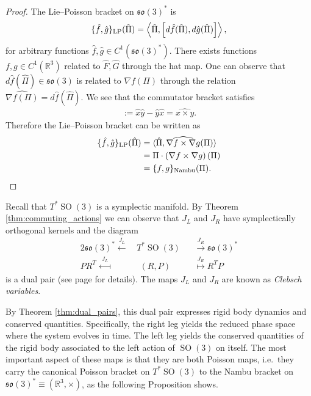 \documentclass[12pt]{amsart}
\newcommand{\so}{\ensuremath{\mathfrak{so}}}
\DeclareMathOperator{\SO}{SO}
\begin{document}
  \begin{proof}
    The Lie--Poisson bracket on $\so(3)^*$ is
    \begin{align*}
      \{ \hat{f} , \hat{g} \}_{\rm LP} (\hat{\Pi}) =
      \left \langle \hat{\Pi} , \left[ d\hat{f}(\hat{\Pi}) , d\hat{g}(\hat{\Pi}) \right]
        \right \rangle,
    \end{align*}
    for arbitrary functions $\hat{f},\hat{g} \in C^1(\so(3)^*)$.
    There exists functions $f,g \in C^1(\mathbb{R}^3)$ related to $\hat{F},\hat{G}$ through the hat map.
    One can observe that $d\hat{f}(\hat{\Pi}) \in \so(3)$ is 
    related to $\nabla f(\Pi)$ through the relation $\widehat{ \nabla f(\Pi)} = d\hat{f}( \hat{\Pi})$.
    We see that the commutator bracket satisfies
    \begin{align*}
      [\hat{x},\hat{y} ] := \hat{x} \hat{y} - \hat{y} \hat{x} = \widehat{x \times y }.
    \end{align*}
    Therefore the Lie--Poisson bracket can be written as
    \begin{align*}
    \{ \hat{f} , \hat{g} \}_{\rm LP}(\hat{\Pi})
    &= \langle \hat{\Pi} , \widehat{ \nabla f \times \nabla g }(\Pi) \rangle \\
    &= \Pi \cdot  \left( \nabla f \times \nabla g \right)(\Pi) \\
    &= \{ f , g \}_{\rm Nambu}(\Pi).
    \end{align*}
  \end{proof}

  Recall that $T^*\SO(3)$ is a symplectic manifold.
  By Theorem \ref{thm:commuting_actions}
  we can observe that $J_L$ and $J_R$ have symplectically
  orthogonal kernels and the diagram
  \begin{alignat*}{2}
    \so(3)^* \stackrel{J_L}{\longleftarrow}&
    \,T^* \SO(3)
    &&\stackrel{J_R}{\longrightarrow} \so(3)^* \\
     PR^T \stackrel{J_L}{\longmapsfrom}&
    \;\; (R,P)
    &&\stackrel{J_R}{\longmapsto} R^TP
  \end{alignat*}
  is a dual pair
  (see page \pageref{thm:dual_pairs} for details).
  The maps $J_L$ and $J_R$ are known as \emph{Clebsch variables}. 

  By Theorem \ref{thm:dual_pairs}, this dual pair expresses rigid
  body dynamics and conserved quantities.
  Specifically, the right leg yields the reduced phase space where 
  the system evolves in time.
  The left leg yields the conserved quantities of the rigid body
  associated to the left action of $\SO(3)$ on itself.
  The most important aspect of these maps is that they are both Poisson
  maps, i.e.\ they carry the canonical Poisson bracket on $T^* \SO(3)$
  to the Nambu bracket on $\so(3)^* \equiv (\mathbb{R}^3,\times)$,
  as the following Proposition shows.
\end{document}
